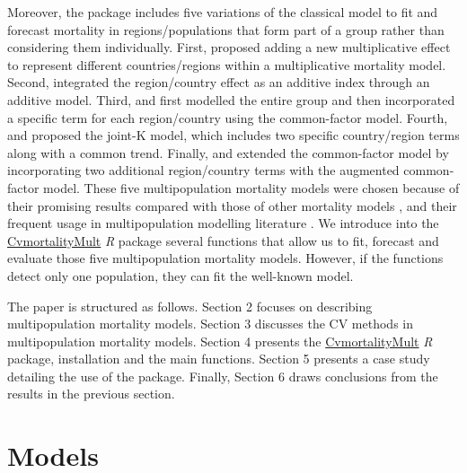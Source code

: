 Moreover, the package includes five variations of the classical \citet{Lee1992} model to fit and forecast mortality in regions/populations that form part of a group rather than considering them individually. First, \citet{Russolillo2011} proposed adding a new multiplicative effect to represent different countries/regions within a multiplicative mortality model. Second, \citet{Debon2011} integrated the region/country effect as an additive index through an additive model. Third, \citet{Carter1992} and \citet{Li2005} first modelled the entire group and then incorporated a specific term for each region/country using the common-factor model. Fourth, \citet{Carter1992} and \citet{Wilmoth2001} proposed the joint-K model, which includes two specific country/region terms along with a common trend. Finally, \citet{Li2005} and \citet{Hyndman2007} extended the common-factor model by incorporating two additional region/country terms with the augmented common-factor model. These five multipopulation mortality models were chosen because of their promising results compared with those of other mortality models \citep{Debon2011, Dong2020}, and their frequent usage in multipopulation modelling literature \citep{Villegas2017}. We introduce into the \href{https://cran.r-project.org/web/packages/CvmortalityMult/index.html}{CvmortalityMult} \emph{R} package several functions that allow us to fit, forecast and evaluate those five multipopulation mortality models. However, if the functions detect only one population, they can fit the well-known \citet{Lee1992} model.

The paper is structured as follows. Section 2 focuses on describing multipopulation mortality models. Section 3 discusses the CV methods in multipopulation mortality models. Section 4 presents the \href{https://cran.r-project.org/web/packages/CvmortalityMult/index.html}{CvmortalityMult} \emph{R} package, installation and the main functions. Section 5 presents a case study detailing the use of the package. Finally, Section 6 draws conclusions from the results in the previous section.

\section{Models} \label{sec:models}

